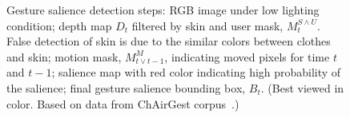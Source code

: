 \begin{figure}[tb]
\centering
\hspace{-0.6em}%
\caption{Gesture salience detection steps:  RGB image under low lighting condition;
 depth map $D_t$ filtered by skin and user mask, $M_t^{S\wedge U}$. False detection of skin is due to
the similar colors between clothes and skin;  motion mask,  $M_{t\vee t-1}^M$, indicating moved pixels for time $t$ and $t-1$;
 salience map with red color indicating high probability of the salience;
 final gesture salience bounding box, $B_t$. (Best viewed in
color. Based on data from ChAirGest corpus~\cite{Ruffieux2013}.)}
\label{fig:gesture-salience}
\end{figure}

